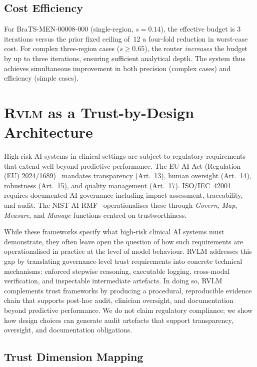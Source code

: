\documentclass{article}
\newcommand{\RVLM}{\textsc{Rvlm}}
\begin{document}
	\subsection{Cost Efficiency}
	
	For BraTS-MEN-00008-000 (single-region, $s=0.14$), the effective budget is
	3 iterations versus the prior fixed ceiling of~12 a four-fold reduction
	in worst-case cost.
	For complex three-region cases ($s \ge 0.65$), the router \emph{increases}
	the budget by up to three iterations, ensuring sufficient analytical depth.
	The system thus achieves simultaneous improvement in both precision (complex
	cases) and efficiency (simple cases).
	
	
	\section{\RVLM{} as a Trust-by-Design Architecture}
	\label{sec:trust}
	
	High-risk AI systems in clinical settings are subject to regulatory
	requirements that extend well beyond predictive performance.
	The EU AI Act (Regulation (EU) 2024/1689)~\citep{euaiact2024} mandates
	transparency (Art.~13), human oversight (Art.~14), robustness (Art.~15),
	and quality management (Art.~17).
	ISO/IEC~42001~\citep{iso42001} requires documented AI governance including
	impact assessment, traceability, and audit.
	The NIST AI RMF~\citep{nist_rmf} operationalises these through
	\textit{Govern}, \textit{Map}, \textit{Measure}, and \textit{Manage}
	functions centred on trustworthiness.
	
	While these frameworks specify what high-risk clinical AI systems must demonstrate, they often leave open the question of how such requirements are operationalised in practice at the level of model behaviour. RVLM addresses this gap by translating governance-level trust requirements into concrete technical mechanisms: enforced stepwise reasoning, executable logging, cross-modal verification, and inspectable intermediate artefacts. In doing so, RVLM complements trust frameworks by producing a procedural, reproducible evidence chain that supports post-hoc audit, clinician oversight, and documentation beyond predictive performance. We do not claim regulatory compliance; we show how design choices can generate audit artefacts that support transparency, oversight, and documentation obligations.
	
	\subsection{Trust Dimension Mapping}
	
\end{document}
